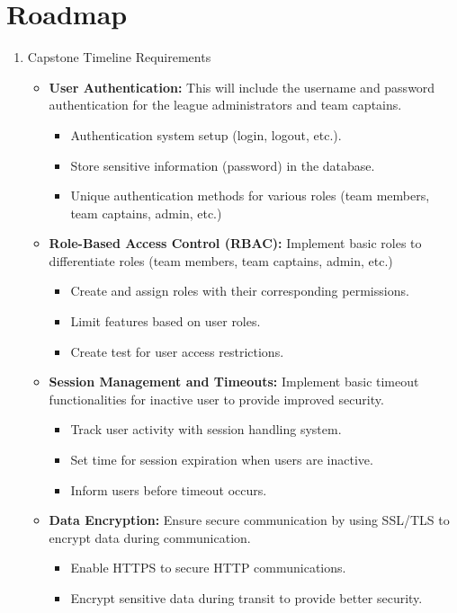 \documentclass{article}
\begin{document}
\section{Roadmap}

\begin{enumerate}
	\item Capstone Timeline Requirements
		\begin{itemize}
			\item \textbf{User Authentication:} This will include the username and password authentication for the league administrators and team captains.
			\begin{itemize}
				\item Authentication system setup (login, logout, etc.).
				\item Store sensitive information (password) in  the database.
				\item Unique authentication methods for various roles (team members, team captains, admin, etc.)
			\end{itemize}
			\item \textbf{Role-Based Access Control (RBAC):} Implement basic roles to differentiate roles (team members, team captains, admin, etc.)
			\begin{itemize}
				\item Create and assign roles with their corresponding permissions.
				\item Limit features based on user roles.
				\item Create test for user access restrictions.
			\end{itemize}
			\item \textbf{Session Management and Timeouts:} Implement basic timeout functionalities for inactive user to provide improved security.
			\begin{itemize}
				\item Track user activity with session handling system.
				\item Set time for session expiration when users are inactive.
				\item Inform users before timeout occurs.
			\end{itemize}
			\item \textbf{Data Encryption:} Ensure secure communication by using SSL/TLS to encrypt data during communication.
			\begin{itemize}
				\item Enable HTTPS to secure HTTP communications.
				\item Encrypt sensitive data during transit to provide better security.

\end{itemize}
\end{itemize}
\end{enumerate}
\end{document}
